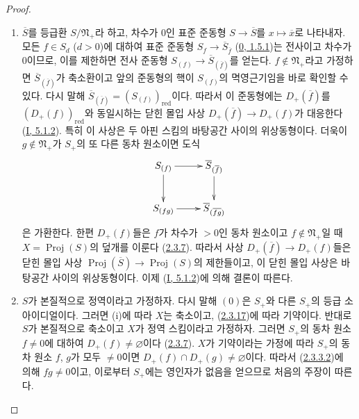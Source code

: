 \begin{proof}
\begin{enumerate}
  \item[\rm(i)] $\overline{S}$를 등급환 $S/\mathfrak{N}_+$라 하고, 차수가
    $0$인 표준 준동형 $S\to\overline{S}$를
    $x\mapsto\overline{x}$로 나타내자. 모든 $f\in S_d$ ($d>0$)에 대하여
    표준 준동형
    $S_f\to\overline{S}_{\overline{f}}$
    (\hyperref[0.1.5.1-ko]{0, 1.5.1})는 전사이고 차수가 $0$이므로, 이를
    제한하면 전사 준동형
    $S_{(f)}\to\overline{S}_{(\overline{f})}$를 얻는다.
    $f\notin\mathfrak{N}_+$라고 가정하면
    $\overline{S}_{(\overline{f})}$가 축소환이고 앞의 준동형의 핵이
    $S_{(f)}$의 멱영근기임을 바로 확인할 수 있다. 다시 말해
    $\overline{S}_{(\overline{f})}=(S_{(f)})_{\mathrm{red}}$이다. 따라서 이
    준동형에는 $D_+(\overline{f})$를 $(D_+(f))_{\mathrm{red}}$와 동일시하는
    닫힌 몰입 사상
    $D_+(\overline{f})\to D_+(f)$가 대응한다
    (\hyperref[I.5.1.2-ko]{I, 5.1.2}). 특히 이 사상은 두 아핀 스킴의
    바탕공간 사이의 위상동형이다. 더욱이
    $g\notin\mathfrak{N}_+$가 $S_+$의 또 다른 동차 원소이면 도식
    \[
      \xymatrix{
        S_{(f)}\ar[r]\ar[d]
        & \overline{S}_{(\overline{f})}\ar[d]\\
        S_{(fg)}\ar[r]
        & \overline{S}_{(\overline{fg})}
      }
    \]
    은 가환한다. 한편 $D_+(f)$들은 $f$가 차수가 $>0$인 동차 원소이고
    $f\notin\mathfrak{N}_+$일 때
    $X=\operatorname{Proj}(S)$의 덮개를 이룬다
    (\hyperref[II.2.3.7-ko]{2.3.7}). 따라서 사상
    $D_+(\overline{f})\to D_+(f)$들은 닫힌 몰입 사상
    $\operatorname{Proj}(\overline{S})\to\operatorname{Proj}(S)$의
    제한들이고, 이 닫힌 몰입 사상은 바탕공간 사이의 위상동형이다. 이제
    (\hyperref[I.5.1.2-ko]{I, 5.1.2})에 의해 결론이 따른다.
  \item[\rm(ii)] $S$가 본질적으로 정역이라고 가정하자. 다시 말해
    $(0)$은 $S_+$와 다른 $S_+$의 등급 소아이디얼이다. 그러면 (i)에 따라
    $X$는 축소이고, (\hyperref[II.2.3.17-ko]{2.3.17})에 따라 기약이다.
    반대로 $S$가 본질적으로 축소이고 $X$가 정역 스킴이라고 가정하자.
    그러면 $S_+$의 동차 원소 $f\neq0$에 대하여
    $D_+(f)\neq\varnothing$이다
    (\hyperref[II.2.3.7-ko]{2.3.7}). $X$가 기약이라는 가정에 따라
    $S_+$의 동차 원소 $f$, $g$가 모두 $\neq0$이면
    $D_+(f)\cap D_+(g)\neq\varnothing$이다. 따라서
    (\hyperref[II.2.3.3.2-ko]{2.3.3.2})에 의해 $fg\neq0$이고, 이로부터
    $S_+$에는 영인자가 없음을 얻으므로 처음의 주장이 따른다.
\end{enumerate}
\end{proof}

